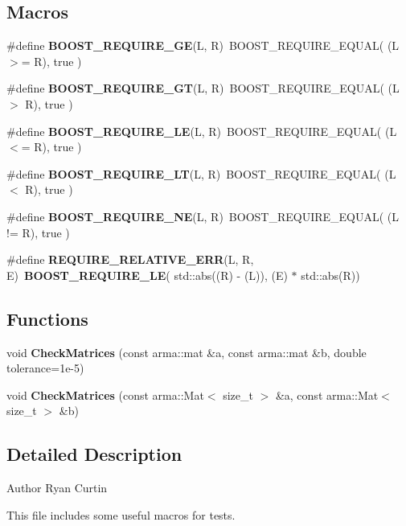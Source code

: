 \subsection*{Macros}
\begin{DoxyCompactItemize}
\item 
\#define {\bf B\+O\+O\+S\+T\+\_\+\+R\+E\+Q\+U\+I\+R\+E\+\_\+\+GE}(L,  R)~B\+O\+O\+S\+T\+\_\+\+R\+E\+Q\+U\+I\+R\+E\+\_\+\+E\+Q\+U\+AL( (L $>$= R), true )
\item 
\#define {\bf B\+O\+O\+S\+T\+\_\+\+R\+E\+Q\+U\+I\+R\+E\+\_\+\+GT}(L,  R)~B\+O\+O\+S\+T\+\_\+\+R\+E\+Q\+U\+I\+R\+E\+\_\+\+E\+Q\+U\+AL( (L $>$ R), true )
\item 
\#define {\bf B\+O\+O\+S\+T\+\_\+\+R\+E\+Q\+U\+I\+R\+E\+\_\+\+LE}(L,  R)~B\+O\+O\+S\+T\+\_\+\+R\+E\+Q\+U\+I\+R\+E\+\_\+\+E\+Q\+U\+AL( (L $<$= R), true )
\item 
\#define {\bf B\+O\+O\+S\+T\+\_\+\+R\+E\+Q\+U\+I\+R\+E\+\_\+\+LT}(L,  R)~B\+O\+O\+S\+T\+\_\+\+R\+E\+Q\+U\+I\+R\+E\+\_\+\+E\+Q\+U\+AL( (L $<$ R), true )
\item 
\#define {\bf B\+O\+O\+S\+T\+\_\+\+R\+E\+Q\+U\+I\+R\+E\+\_\+\+NE}(L,  R)~B\+O\+O\+S\+T\+\_\+\+R\+E\+Q\+U\+I\+R\+E\+\_\+\+E\+Q\+U\+AL( (L != R), true )
\item 
\#define {\bf R\+E\+Q\+U\+I\+R\+E\+\_\+\+R\+E\+L\+A\+T\+I\+V\+E\+\_\+\+E\+RR}(L,  R,  E)~{\bf B\+O\+O\+S\+T\+\_\+\+R\+E\+Q\+U\+I\+R\+E\+\_\+\+LE}( std\+::abs((R) -\/ (L)), (E) $\ast$ std\+::abs(R))
\end{DoxyCompactItemize}
\subsection*{Functions}
\begin{DoxyCompactItemize}
\item 
void {\bf Check\+Matrices} (const arma\+::mat \&a, const arma\+::mat \&b, double tolerance=1e-\/5)
\item 
void {\bf Check\+Matrices} (const arma\+::\+Mat$<$ size\+\_\+t $>$ \&a, const arma\+::\+Mat$<$ size\+\_\+t $>$ \&b)
\end{DoxyCompactItemize}


\subsection{Detailed Description}
\begin{DoxyAuthor}{Author}
Ryan Curtin
\end{DoxyAuthor}
This file includes some useful macros for tests.

